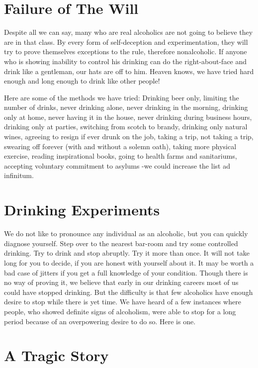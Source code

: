 \section{Failure of The Will}

Despite all we can say, many who are real alcoholics are not going to believe they are in that class. 
By every form of self-deception and experimentation, 
they will try to prove themselves exceptions to the rule, therefore nonalcoholic. 
If anyone who is showing inability to control his drinking 
can do the right-about-face and drink like a gentleman, our hats are off to him. 
Heaven knows, we have tried hard enough and long enough to drink like other people!

Here are some of the methods we have tried: 
Drinking beer only, 
limiting the number of drinks, 
never drinking alone, 
never drinking in the morning, 
drinking only at home, 
never having it in the house, 
never drinking during business hours, 
drinking only at parties, 
switching from scotch to brandy, 
drinking only natural wines, 
agreeing to resign if ever drunk on the job, 
taking a trip, 
not taking a trip, 
swearing off forever (with and without a solemn oath), 
taking more physical exercise, 
reading inspirational books, 
going to health farms and sanitariums, 
accepting voluntary commitment to asylums 
-we could increase the list ad infinitum. 


\section{Drinking Experiments}

We do not like to pronounce any individual as an alcoholic, but you can quickly diagnose yourself. 
Step over to the nearest bar-room and try some controlled drinking. 
Try to drink and stop abruptly. 
Try it more than once. 
It will not take long for you to decide, if you are honest with yourself about it. 
It may be worth a bad case of jitters if you get a full knowledge of your condition.
Though there is no way of proving it, 
we believe that early in our drinking careers most of us could have stopped drinking. 
But the difficulty is that few alcoholics have enough desire to stop while there is yet time. 
We have heard of a few instances where people, who showed definite signs of alcoholism, 
were able to stop for a long period because of an overpowering desire to do so. 
Here is one.


\section{A Tragic Story}

